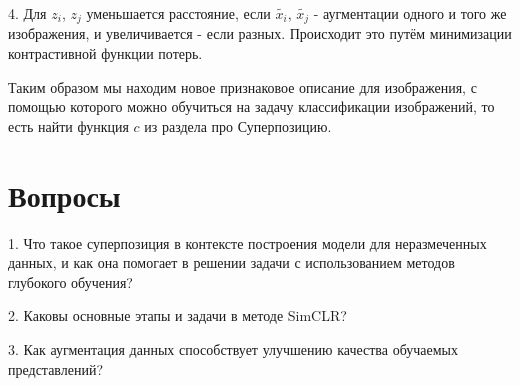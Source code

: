 4. Для $z_i$, $z_j$ уменьшается расстояние, если $\tilde{x_i}$, $\tilde{x_j}$ - аугментации одного и того же изображения, и увеличивается - если разных. Происходит это путём минимизации контрастивной функции потерь. 

Таким образом мы находим новое признаковое описание для изображения, с помощью которого можно обучиться на задачу классификации изображений, то есть найти функция $c$ из раздела про Суперпозицию.

\section{Вопросы}
\hspace{2em}1. Что такое суперпозиция в контексте построения модели для неразмеченных данных, и как она помогает в решении задачи с использованием методов глубокого обучения?

2. Каковы основные этапы и задачи в методе SimCLR?

3. Как аугментация данных способствует улучшению качества обучаемых представлений?

